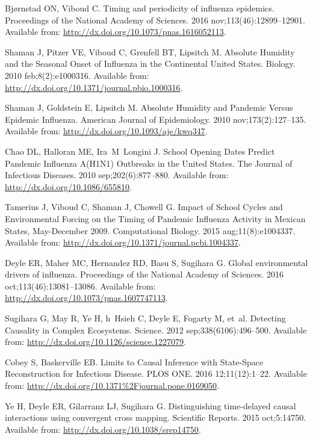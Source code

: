 \documentclass[11pt]{article}
\begin{document}

\begin{thebibliography}{1}

Bj{\o}rnstad ON, Viboud C.
\newblock Timing and periodicity of influenza epidemics.
\newblock Proceedings of the National Academy of Sciences. 2016
  nov;113(46):12899--12901.
\newblock Available from: \url{http://dx.doi.org/10.1073/pnas.1616052113}.

Shaman J, Pitzer VE, Viboud C, Grenfell BT, Lipsitch M.
\newblock Absolute Humidity and the Seasonal Onset of Influenza in the
  Continental United States.
 Biology. 2010 feb;8(2):e1000316.
\newblock Available from: \url{http://dx.doi.org/10.1371/journal.pbio.1000316}.

Shaman J, Goldstein E, Lipsitch M.
\newblock Absolute Humidity and Pandemic Versus Epidemic Influenza.
\newblock American Journal of Epidemiology. 2010 nov;173(2):127--135.
\newblock Available from: \url{http://dx.doi.org/10.1093/aje/kwq347}.

Chao DL, Halloran ME, Ira~M~Longini J.
\newblock School Opening Dates Predict Pandemic Influenza A(H1N1) Outbreaks in
  the United States.
\newblock The Journal of Infectious Diseases. 2010 sep;202(6):877--880.
\newblock Available from: \url{http://dx.doi.org/10.1086/655810}.

Tamerius J, Viboud C, Shaman J, Chowell G.
\newblock Impact of School Cycles and Environmental Forcing on the Timing of
  Pandemic Influenza Activity in Mexican States, May-December 2009.
 Computational Biology. 2015 aug;11(8):e1004337.
\newblock Available from: \url{http://dx.doi.org/10.1371/journal.pcbi.1004337}.

Deyle ER, Maher MC, Hernandez RD, Basu S, Sugihara G.
\newblock Global environmental drivers of influenza.
\newblock Proceedings of the National Academy of Sciences. 2016
  oct;113(46):13081--13086.
\newblock Available from: \url{http://dx.doi.org/10.1073/pnas.1607747113}.

Sugihara G, May R, Ye H, h~Hsieh C, Deyle E, Fogarty M, et~al.
\newblock Detecting Causality in Complex Ecosystems.
\newblock Science. 2012 sep;338(6106):496--500.
\newblock Available from: \url{http://dx.doi.org/10.1126/science.1227079}.

Cobey S, Baskerville EB.
\newblock Limits to Causal Inference with State-Space Reconstruction for
  Infectious Disease.
\newblock PLOS ONE. 2016 12;11(12):1--22.
\newblock Available from:
  \url{http://dx.doi.org/10.1371%2Fjournal.pone.0169050}.

Ye H, Deyle ER, Gilarranz LJ, Sugihara G.
\newblock Distinguishing time-delayed causal interactions using convergent
  cross mapping.
\newblock Scientific Reports. 2015 oct;5:14750.
\newblock Available from: \url{http://dx.doi.org/10.1038/srep14750}.

\end{thebibliography}
\end{document}
